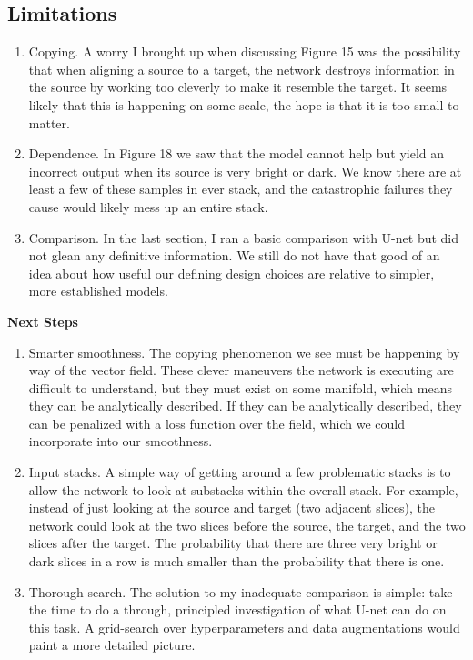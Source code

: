 \documentclass[12pt,a4paper]{article}
\begin{document}
\subsection{ Limitations}

\begin{enumerate} 
  \item Copying. A worry I brought up when discussing Figure 15 was the possibility that when aligning a source to a target, the network destroys information in the source by working too cleverly to make it resemble the target. It seems likely that this is happening on some scale, the hope is that it is too small to matter.
    \item Dependence. In Figure 18 we saw that the model cannot help but yield an incorrect output when its source is very bright or dark. We know there are at least a few of these samples in ever stack, and the catastrophic failures they cause would likely mess up an entire stack.
  \item Comparison. In the last section, I ran a basic comparison with U-net but did not glean any definitive information. We still do not have that good of an idea about how useful our defining design choices are relative to simpler, more established models.
\end{enumerate}

{\bf Next Steps}
\begin{enumerate} 
  \item Smarter smoothness. The copying phenomenon we see must be happening by way of the vector field. These clever maneuvers the network is executing are difficult to understand, but they must exist on some manifold, which means they can be analytically described. If they can be analytically described, they can be penalized with a loss function over the field, which we could incorporate into our smoothness.  
  \item Input stacks. A simple way of getting around a few problematic stacks is to allow the network to look at substacks within the overall stack. For example, instead of just looking at the source and target (two adjacent slices), the network could look at the two slices before the source, the target, and the two slices after the target. The probability that there are three very bright or dark slices in a row is much smaller than the probability that there is one.
  \item Thorough search. The solution to my inadequate comparison is simple: take the time to do a through, principled investigation of what U-net can do on this task. A grid-search over hyperparameters and data augmentations would paint a more detailed picture.\
\end{enumerate}


\newpage



{}

\end{document}
